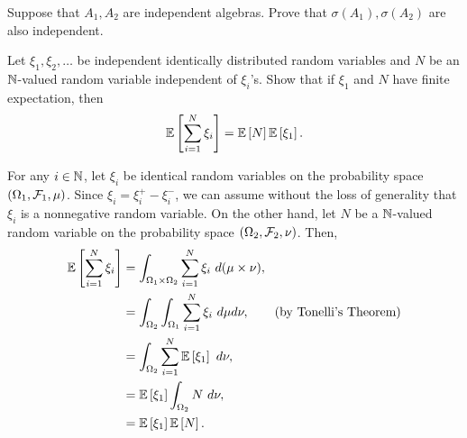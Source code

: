 \begin{problem}{13}
    Suppose that $A_1, A_2$ are independent algebras. Prove that $\sigma(A_1), \sigma(A_2)$ are also independent.
\end{problem}
\begin{solution}
    
\end{solution}

\begin{problem}{14}
Let $\xi_1,\xi_2,\ldots$ be independent identically distributed random variables and $N$ be an $\mathbb{N}$-valued random variable independent of $\xi_i$'s. Show that if $\xi_1$ and $N$ have finite expectation, then \[
    \mathbb{E}\left[\sum_{i=1}^N \xi_i\right] = \mathbb{E}\left[N\right]\mathbb{E}\left[\xi_1\right].
\]
\end{problem}
\begin{solution}
    For any $i \in \mathbb{N}$, let $\xi_i$ be identical random variables on the probability space $(\Omega_1, \mathcal{F}_1, \mu)$. 
    Since $\xi_i = \xi_i^+ - \xi_i^-$, we can assume without the loss of generality that $\xi_i$ is a nonnegative random variable. 
    On the other hand, let $N$ be a $\mathbb{N}$-valued random variable on the probability space $(\Omega_2, \mathcal{F}_2, \nu)$. Then,
    \begin{align*}
        \mathbb{E}\left[\sum_{i=1}^N \xi_i\right] &= \int_{\Omega_1 \times \Omega_2} \sum_{i=1}^N \xi_i~d(\mu \times \nu), \\
        &= \int_{\Omega_2}\int_{\Omega_1} \sum_{i=1}^N \xi_i~d\mu d\nu, \tag{by Tonelli's Theorem}\\
        &= \int_{\Omega_2} \sum_{i=1}^N \mathbb{E}\left[\xi_1\right]~d\nu, \\
        &= \mathbb{E}\left[\xi_1\right] \int_{\Omega_2} N~d\nu, \\
        &= \mathbb{E}\left[\xi_1\right] \mathbb{E}\left[N\right].
    \end{align*}
\end{solution}
